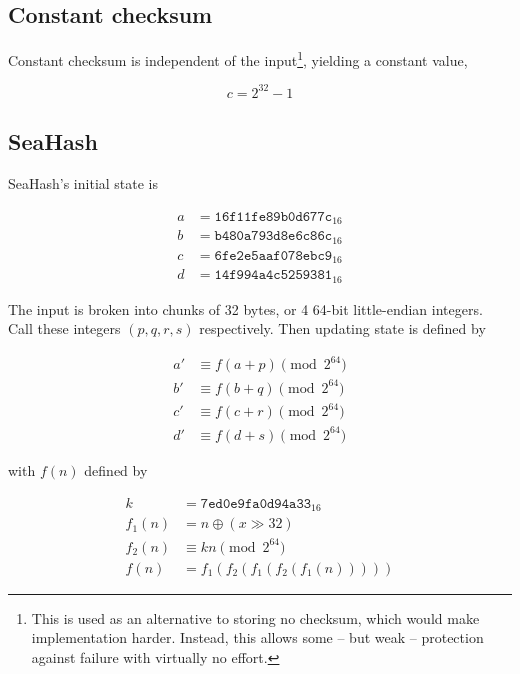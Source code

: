 \documentclass[11pt,a4paper]{report}
\begin{document}
        \subsection{Constant checksum}
        \label{checksum:seahash}
        Constant checksum is independent of the input\footnote{This is used as
        an alternative to storing no checksum, which would make implementation
        harder. Instead, this allows some -- but weak -- protection against failure
        with virtually no effort.}, yielding a constant value,

        $$c = 2^{32} - 1$$

        \subsection{SeaHash}
        \label{checksum:seahash}
        SeaHash's initial state is

        \begin{align*}
            a &= \texttt{16f11fe89b0d677c}_{16} \\
            b &= \texttt{b480a793d8e6c86c}_{16} \\
            c &= \texttt{6fe2e5aaf078ebc9}_{16} \\
            d &= \texttt{14f994a4c5259381}_{16}
        \end{align*}

        The input is broken into chunks of 32 bytes, or 4 64-bit little-endian
        integers. Call these integers $(p, q, r, s)$ respectively. Then
        updating state is defined by

        \begin{align*}
            a' &\equiv f(a + p) \pmod{2^{64}} \\
            b' &\equiv f(b + q) \pmod{2^{64}} \\
            c' &\equiv f(c + r) \pmod{2^{64}} \\
            d' &\equiv f(d + s) \pmod{2^{64}}
        \end{align*}

        with $f(n)$ defined by

        \begin{align*}
            k      &=      \texttt{7ed0e9fa0d94a33}_{16} \\
            f_1(n) &=      n \oplus (x \gg 32) \\
            f_2(n) &\equiv kn \pmod{2^{64}} \\
            f(n)   &=      f_1(f_2(f_1(f_2(f_1(n)))))
        \end{align*}
\end{document}
